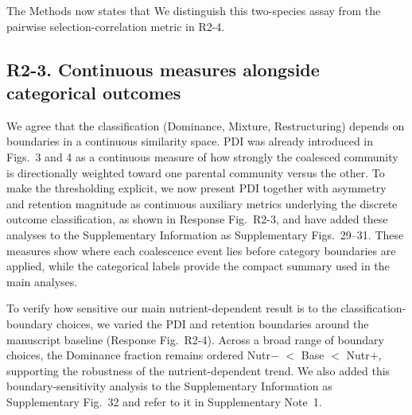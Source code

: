 The Methods now states that  We distinguish this two-species assay from the pairwise selection-correlation metric in R2-4.

\subsection*{R2-3. Continuous measures alongside categorical outcomes}

\responselabel
We agree that the classification (Dominance, Mixture, Restructuring) depends on boundaries in a continuous similarity space. PDI was already introduced in Figs.~3 and 4 as a continuous measure of how strongly the coalesced community is directionally weighted toward one parental community versus the other. To make the thresholding explicit, we now present PDI together with asymmetry and retention magnitude as continuous auxiliary metrics underlying the discrete outcome classification, as shown in Response Fig.~R2-3, and have added these analyses to the Supplementary Information as Supplementary Figs.~29--31. These measures show where each coalescence event lies before category boundaries are applied, while the categorical labels provide the compact summary used in the main analyses.

To verify how sensitive our main nutrient-dependent result is to the classification-boundary choices, we varied the PDI and retention boundaries around the manuscript baseline (Response Fig.~R2-4). Across a broad range of boundary choices, the Dominance fraction remains ordered Nutr$-$ $<$ Base $<$ Nutr$+$, supporting the robustness of the nutrient-dependent trend. We also added this boundary-sensitivity analysis to the Supplementary Information as Supplementary Fig.~32 and refer to it in Supplementary Note~1.

